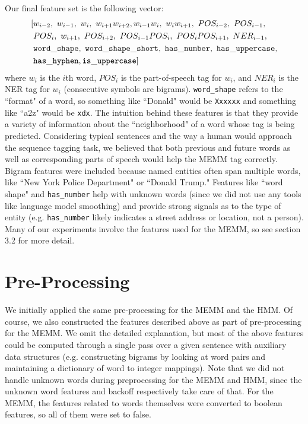 \documentclass[12pt]{article}
\begin{document}
Our final feature set is the following vector:
\begin{equation*}
\begin{split}
[&w_{i - 2},\ w_{i - 1},\ w_i,\ w_{i + 1}w_{i + 2},
w_{i - 1}w_i,\ w_iw_{i + 1},\ POS_{i - 2},\ POS_{i - 1},\\
&POS_i,\ w_{i + 1},\ POS_{i + 2}, \ POS_{i - 1}POS_i,\ POS_iPOS_{i + 1},\ NER_{i - 1},\\
&{\tt word\_shape,\ word\_shape\_short,\ has\_number,\ has\_uppercase,}\\
&{\tt has\_hyphen, is\_uppercase}
]
\end{split}
\end{equation*}
where $w_i$ is the $i$th word, $POS_i$ is the part-of-speech tag for $w_i$, and $NER_i$ is the NER tag for $w_i$ (consecutive symbols are bigrams). {\tt word\_shape} refers to the ``format" of a word, so something like ``Donald" would be {\tt Xxxxxx} and something like ``a2z" would be {\tt xdx}.
The intuition behind these features is that they provide a variety of information about the ``neighborhood" of a word whose tag is being predicted. Considering typical sentences and the way a human would approach the sequence tagging task, we believed that both previous and future words as well as corresponding parts of speech would help the MEMM tag correctly. Bigram features were included because named entities often span multiple words, like ``New York Police Department" or ``Donald Trump." Features like ``word shape" and {\tt has\_number} help with unknown words (since we did not use any tools like language model smoothing) and provide strong signals as to the type of entity (e.g. {\tt has\_number} likely indicates a street address or location, not a person). Many of our experiments involve the features used for the MEMM, so see section 3.2 for more detail.
\section{Pre-Processing}
We initially applied the same pre-processing for the MEMM and the HMM. Of course, we also constructed the features described above as part of pre-processing for the MEMM. We omit the detailed explanation, but most of the above features could be computed through a single pass over a given sentence with auxiliary data structures (e.g. constructing bigrams by looking at word pairs and maintaining a dictionary of word to integer mappings). Note that we did not handle unknown words during preprocessing for the MEMM and HMM, since the unknown word features and backoff respectively take care of that. For the MEMM, the features related to words themselves were converted to boolean features, so all of them were set to false.
\end{document}
